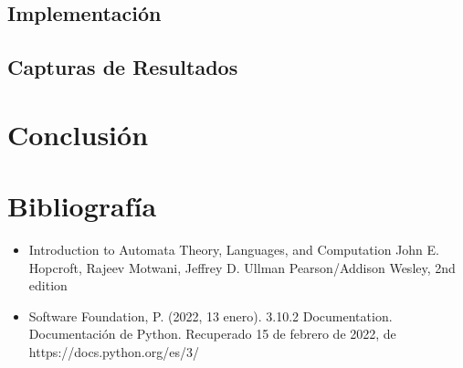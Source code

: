 \documentclass{article}
\begin{document}
\subsection{Implementaci\'on}

\subsection{Capturas de Resultados}

\section{Conclusi\'on}

\section{Bibliograf\'ia}
\begin{itemize}
    \item Introduction to Automata Theory, Languages, and Computation
    John E. Hopcroft, Rajeev Motwani, Jeffrey D. Ullman
    Pearson/Addison Wesley, 2nd edition
    \item Software Foundation, P. (2022, 13 enero). 3.10.2 Documentation. Documentación de Python. Recuperado 15 de febrero de 2022, de https://docs.python.org/es/3/
\end{itemize}
\end{document}
